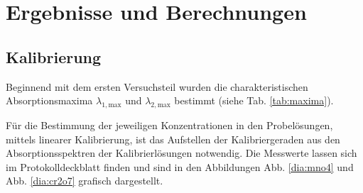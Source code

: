 \newpage
\section{Ergebnisse und Berechnungen}
\label{sec:ergebnisse}

\subsection{Kalibrierung}
Beginnend mit dem ersten Versuchsteil wurden die charakteristischen Absorptionsmaxima $\lambda_{1,\text{max}}$ und $\lambda_{2,\text{max}}$ bestimmt (siehe Tab. \ref{tab:maxima}).

\begin{table}[h!]
	\renewcommand*{\arraystretch}{1.2}
	\centering
	\caption{Absorptionsmaxima  vom Permanganat-Ion $\lambda_{1,\text{max}}$ und vom Dichromat-Ion $\lambda_{2,\text{max}}$ }
	\label{tab:maxima}
\end{table}%
\FloatBarrier

Für die Bestimmung der jeweiligen Konzentrationen in den Probelösungen, mittels linearer Kalibrierung, ist das Aufstellen der Kalibriergeraden aus den Absorptionsspektren der Kalibrierlösungen notwendig. Die Messwerte lassen sich im Protokolldeckblatt finden und sind in den Abbildungen Abb. \ref{dia:mno4} und Abb. \ref{dia:cr2o7} grafisch dargestellt.


